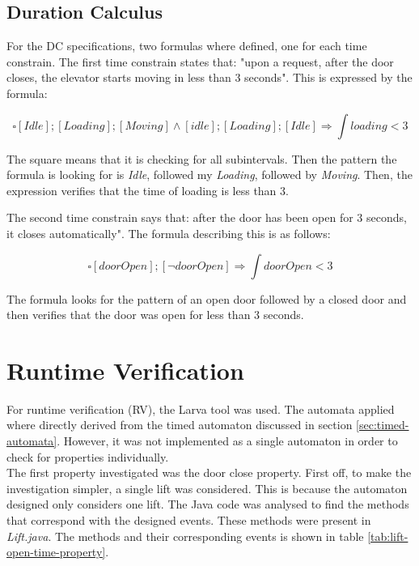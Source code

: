 \documentclass[a4paper, 12pt]{article}
\begin{document}
\subsection{Duration Calculus}
For the DC specifications, two formulas where defined, one for each time constrain. The first time constrain states that: "upon a request, after the door closes, the elevator starts moving in less than 3 seconds". This is expressed by the formula:

$$\square [Idle] ; [Loading] ;  [Moving]  \wedge [idle] ; [Loading] ; [Idle] \Rightarrow \int loading < 3$$

The square means that it is checking for all subintervals. Then the pattern the formula is looking for is \textit{Idle}, followed my \textit{Loading}, followed by \textit{Moving}. Then, the expression verifies that the time of loading is less than 3.

The second time constrain says that: after the door has been open for 3 seconds, it closes automatically". The formula describing this is as follows:

$$\square [doorOpen] ; [\neg doorOpen] \Rightarrow \int doorOpen < 3$$

The formula looks for the pattern of an open door followed by a closed door and then verifies that the door was open for less than 3 seconds. 

\section{Runtime Verification}

For runtime verification (RV), the Larva tool was used. The automata applied where directly derived from the timed automaton discussed in section \ref{sec:timed-automata}. However, it was not implemented as a single automaton in order to check for properties individually. \\

The first property investigated was the door close property. First off, to make the investigation simpler, a single lift was considered. This is because the automaton designed only considers one lift. The Java code was analysed to find the methods that correspond with the designed events. These methods were present in \textit{Lift.java}. The methods and their corresponding events is shown in table \ref{tab:lift-open-time-property}.
\end{document}
